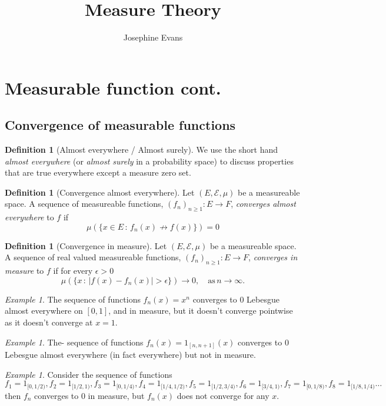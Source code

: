 \documentclass[11pt]{article}
\author{
Josephine Evans
}
\title{Measure Theory}
\theoremstyle{definition}
\newtheorem{dfn}[thm]{Definition}
\theoremstyle{remark}
\newtheorem{ex}[thm]{Example}
\begin{document}
\section{Measurable function cont.}
\subsection{Convergence of measurable functions}
\begin{dfn}[Almost everywhere / Almost surely]
We use the short hand \emph{almost everywhere} (or \emph{almost surely} in a probability space) to discuss properties that are true everywhere except a measure zero set. 
\end{dfn}

\begin{dfn}[Convergence almost everywhere] Let $(E, \mathcal{E}, \mu)$ be a measureable space. A sequence of measureable functions, $(f_n)_{n \geq 1}: E \rightarrow F$, \emph{converges almost everywhere} to $f$ if 
\[ \mu \left( \{ x \in E \,:\, f_n(x) \not\to f(x) \} \right) = 0 \]
\end{dfn}

\begin{dfn}[Convergence in measure]
Let $(E, \mathcal{E}, \mu)$ be a measureable space. A sequence of real valued measureable functions, $(f_n)_{n \geq 1}: E \rightarrow F$, \emph{converges in measure} to $f$ if for every $\epsilon > 0$
\[ \mu \left( \{ x \, :\, |f(x) - f_n(x)| > \epsilon \} \right) \rightarrow 0, \quad \mbox{as}\, n \rightarrow \infty. \]
\end{dfn}

\begin{ex}
The sequence of functions $f_n(x) = x^n$ converges to $0$ Lebesgue almost everywhere on $[0,1]$, and in measure, but it doesn't converge pointwise as it doesn't converge at $x=1$.
\end{ex}
\begin{ex}
The- sequence of functions $f_n(x) = 1_{[n,n+1]}(x)$ converges to 0 Lebesgue almost everywhere (in fact everywhere) but not in measure.
\end{ex}
\begin{ex}
Consider the sequence of functions $f_1 = 1_{[0,1/2)}, f_2 = 1_{[1/2, 1)}, f_3 = 1_{[0,1/4)}, f_4 = 1_{[1/4, 1/2)}, f_5= 1_{[1/2, 3/4)}, f_6 = 1_{[3/4,1)}, f_7 = 1_{[0,1/8)}, f_8 = 1_{[1/8, 1/4)} \dots$ then $f_n$ converges to 0 in measure, but $f_n(x)$ does not converge for any $x$. 
\end{ex}
\end{document}
